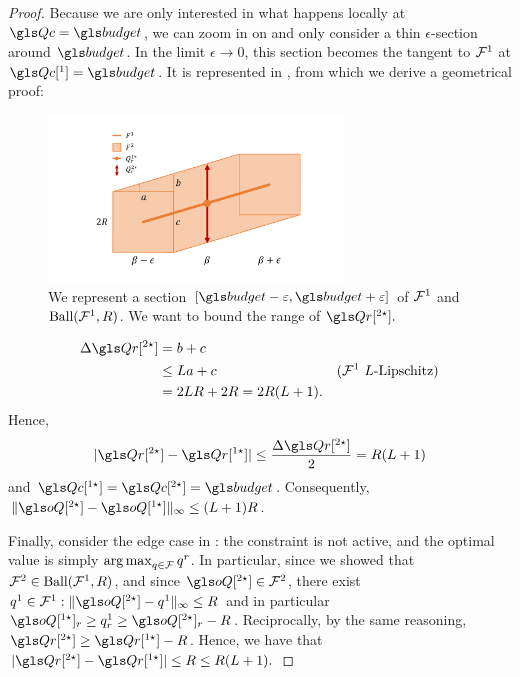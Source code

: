 \begin{subappendices}
\begin{proof}
    Because we are only interested in what happens locally at $\Qc=\budget$, we can zoom in on  and only consider a thin $\epsilon$-section around $\budget$. In the limit $\epsilon\rightarrow 0$, this section becomes the tangent to $\mathcal{F}^1$ at $\Qc[^1]=\budget$. It is represented in , from which we derive a geometrical proof:
    \begin{figure}[ht]
        \centering
        \includegraphics[trim=2cm 1cm 2cm 1cm, clip, width=0.7\textwidth]{img/contraction_lipschitz_slope.pdf}
        \caption{We represent a section $[\budget-\epsilon, \budget+\epsilon]$ of $\mathcal{F}^1$ and $\text{Ball}(\mathcal{F}^1, R)$. We want to bound the range of $\Qr[^{2\star}].$}
        \label{fig:contraction_lips_hull_slope}
    \end{figure}
    \begin{align*}
        \Delta \Qr[^{2\star}] &= b + c &\\
        & \leq La + c & \text{($\cF^1$ $L$-Lipschitz)}\\
        &= 2LR+2R = 2R(L+1).
    \end{align*}
    Hence,
    \begin{equation*}
        | \Qr[^{2\star}] - \Qr[^{1\star}]| \leq \frac{\Delta \Qr[^{2\star}]}{2} = R(L+1)
    \end{equation*}
    and $\Qc[^{1\star}] = \Qc[^{2\star}] = \budget$.
    Consequently, $ \|\oQ[^{2\star}] - \oQ[^{1\star}]\|_\infty \leq (L+1)R$.

    Finally, consider the edge case in : the constraint is not active, and the optimal value is simply $\operatorname*{arg\,max}_{q\in\mathcal{F}} q^r$. In particular, since we showed that $\mathcal{F}^2\in \text{Ball}(\mathcal{F}^1, R)$, and since $\oQ[^{2\star}]\in \cF^2$, there exist $q^1\in \cF^1: \|\oQ[^{2\star}]-q^1\|_\infty\leq R$ and in particular $\oQ[^{1\star}]_r \geq q^1_r \geq \oQ[^{2\star}]_r - R$. Reciprocally, by the same reasoning, $\Qr[^{2\star}] \geq \Qr[^{1\star}] - R$. Hence, we have that $| \Qr[^{2\star}] - \Qr[^{1\star}]| \leq R \leq R(L+1).$


\end{proof}
\end{subappendices}
